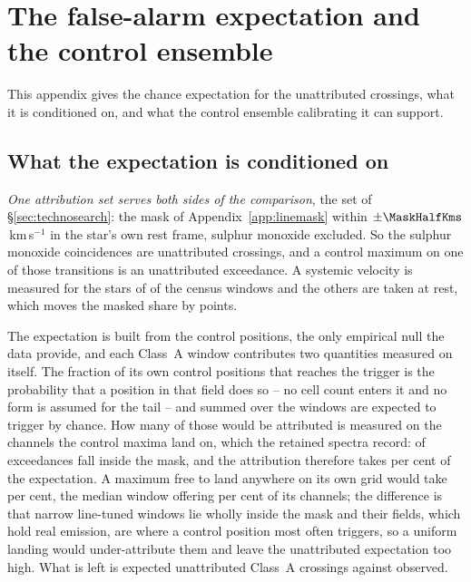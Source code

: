 \section{The false-alarm expectation and the control ensemble}
\label{app:falsealarm}

This appendix gives the chance expectation for the unattributed crossings,
what it is conditioned on, and what the control ensemble calibrating it can
support.

\subsection{What the expectation is conditioned on}

\emph{One attribution set serves both sides of the comparison}, the set of
\S\ref{sec:technosearch}: the mask of Appendix~\ref{app:linemask} within
$\pm\MaskHalfKms$\,km\,s$^{-1}$ in the star's own rest frame, sulphur monoxide
excluded. So the \MkNSODecide{} sulphur monoxide coincidences are unattributed
crossings, and a control maximum on one of those transitions is an
unattributed exceedance. A systemic velocity is measured for the stars of
\CeNVsys{} of the census windows and the others are taken at rest, which moves
the masked share by \CeVsysSensPct{} points.

The expectation is built from the control positions, the only empirical null
the data provide, and each Class~A window contributes two quantities
measured on itself. The fraction of its own \NCtrl{} control positions that
reaches the trigger is the probability that a position in that field does so
-- no cell count enters it and no form is assumed for the tail -- and
summed over the windows \CeExpTrig{} are expected to trigger by chance. How
many of those would be attributed is measured on the channels the control
maxima land on, which the retained spectra record: \CeNExcAttr{} of
\CeNExc{} exceedances fall inside the mask, and the attribution therefore
takes \CeMaskPct{} per cent of the expectation. A maximum free to land
anywhere on its own grid would take \CeUnifPct{} per cent, the median window
offering \CeMaskPctMed{} per cent of its channels; the difference is that
\CeNFullMask{} narrow line-tuned windows lie wholly inside the mask and
their fields, which hold real emission, are where a control position most
often triggers, so a uniform landing would under-attribute them and leave
the unattributed expectation too high. What is
left is \CeExp{} expected unattributed Class~A crossings against \CeObs{}
observed.


